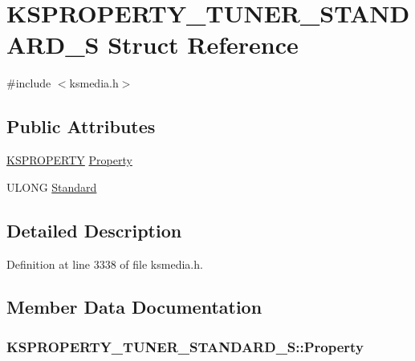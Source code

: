 \hypertarget{struct_k_s_p_r_o_p_e_r_t_y___t_u_n_e_r___s_t_a_n_d_a_r_d___s}{}\section{K\+S\+P\+R\+O\+P\+E\+R\+T\+Y\+\_\+\+T\+U\+N\+E\+R\+\_\+\+S\+T\+A\+N\+D\+A\+R\+D\+\_\+S Struct Reference}
\label{struct_k_s_p_r_o_p_e_r_t_y___t_u_n_e_r___s_t_a_n_d_a_r_d___s}


{\ttfamily \#include $<$ksmedia.\+h$>$}

\subsection*{Public Attributes}
\begin{DoxyCompactItemize}
\item 
\hyperlink{ks_8h_a4392f77c74e868d813d46c39ada4d660}{K\+S\+P\+R\+O\+P\+E\+R\+TY} \hyperlink{struct_k_s_p_r_o_p_e_r_t_y___t_u_n_e_r___s_t_a_n_d_a_r_d___s_aae8bb794d425cc1fa047749859bc1297}{Property}
\item 
U\+L\+O\+NG \hyperlink{struct_k_s_p_r_o_p_e_r_t_y___t_u_n_e_r___s_t_a_n_d_a_r_d___s_aed809b48e08f59d846d855f105d3b4df}{Standard}
\end{DoxyCompactItemize}


\subsection{Detailed Description}


Definition at line 3338 of file ksmedia.\+h.



\subsection{Member Data Documentation}
\subsubsection[{\texorpdfstring{Property}{Property}}]{ K\+S\+P\+R\+O\+P\+E\+R\+T\+Y\+\_\+\+T\+U\+N\+E\+R\+\_\+\+S\+T\+A\+N\+D\+A\+R\+D\+\_\+\+S\+::\+Property}\hypertarget{struct_k_s_p_r_o_p_e_r_t_y___t_u_n_e_r___s_t_a_n_d_a_r_d___s_aae8bb794d425cc1fa047749859bc1297}{}\label{struct_k_s_p_r_o_p_e_r_t_y___t_u_n_e_r___s_t_a_n_d_a_r_d___s_aae8bb794d425cc1fa047749859bc1297}


